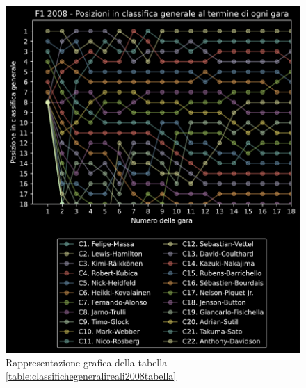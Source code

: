 \documentclass[12pt,a4paper,openright,twoside]{book}
\begin{document}
\begin{figure}[H]
    \centering
     \includegraphics[width=\linewidth]{figures/realstandings2008.pdf}
     \caption{Rappresentazione grafica della tabella \ref{table:classifichegeneralireali2008tabella} }
     \label{fig:classifichegeneralireali2008figura}
 \end{figure}
\end{document}
